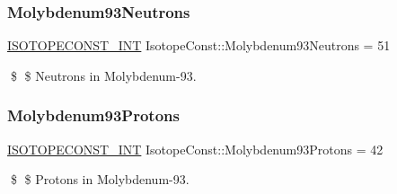 \subsubsection{\texorpdfstring{Molybdenum93\+Neutrons}{Molybdenum93Neutrons}}
{\footnotesize\ttfamily \mbox{\hyperlink{group___isotope_const-_macros_ga5f18360b3e99483a35c32d789e62621c}{I\+S\+O\+T\+O\+P\+E\+C\+O\+N\+S\+T\+\_\+\+I\+NT}} Isotope\+Const\+::\+Molybdenum93\+Neutrons = 51}

\$ \$ Neutrons in Molybdenum-\/93. \mbox{\label{group___isotope_const-_molybdenum-_mo93_ga2c084b8597a75af2565fd2182cbd68ce}} 
\subsubsection{\texorpdfstring{Molybdenum93\+Protons}{Molybdenum93Protons}}
{\footnotesize\ttfamily \mbox{\hyperlink{group___isotope_const-_macros_ga5f18360b3e99483a35c32d789e62621c}{I\+S\+O\+T\+O\+P\+E\+C\+O\+N\+S\+T\+\_\+\+I\+NT}} Isotope\+Const\+::\+Molybdenum93\+Protons = 42}

\$ \$ Protons in Molybdenum-\/93. 